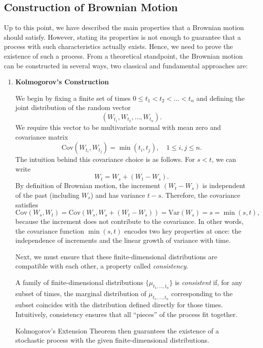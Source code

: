 \subsection{Construction of Brownian Motion}\label{sec:bm-construction}
Up to this point, we have described the main properties that a Brownian motion should satisfy. 
However, stating its properties is not enough to guarantee that a process with such characteristics actually exists.
Hence, we need to prove the existence of such a process.
From a theoretical standpoint, the Brownian motion can be constructed in several ways, two classical and fundamental approaches are:

\begin{enumerate}
    \item \textbf{Kolmogorov's Construction}

    We begin by fixing a finite set of times $0 \le t_1 < t_2 < \dots < t_n$ and defining the joint distribution of the random vector
\[
(W_{t_1}, W_{t_2}, \dots, W_{t_n}).
\]
We require this vector to be multivariate normal with mean zero and covariance matrix
\[
\text{Cov}(W_{t_i}, W_{t_j}) = \min(t_i, t_j), \quad 1 \le i,j \le n.
\]
The intuition behind this covariance choice is as follows. For $s < t$, we can write
\[
W_t = W_s + (W_t - W_s).
\]
By definition of Brownian motion, the increment $(W_t - W_s)$ is independent of the past (including $W_s$) and has variance $t-s$. 
Therefore, the covariance satisfies
\[
\text{Cov}(W_s, W_t) = \text{Cov}(W_s, W_s + (W_t - W_s)) = \text{Var}(W_s) = s = \min(s,t),
\]
because the increment does not contribute to the covariance. 
In other words, the covariance function $\min(s,t)$ encodes two key properties at once: the independence of increments and the linear growth of variance with time.
    
    
Next, we must ensure that these finite-dimensional distributions are compatible with each other, a property called \emph{consistency}. 

A family of finite-dimensional distributions $\{\mu_{t_1, \dots, t_n}\}$ is \emph{consistent} if, for any subset of times, the marginal distribution of $\mu_{t_1, \dots, t_n}$ corresponding to the subset coincides with the distribution defined directly for those times. 
Intuitively, consistency ensures that all “pieces” of the process fit together.

Kolmogorov's Extension Theorem then guarantees the existence of a stochastic process with the given finite-dimensional distributions.


\end{enumerate}
